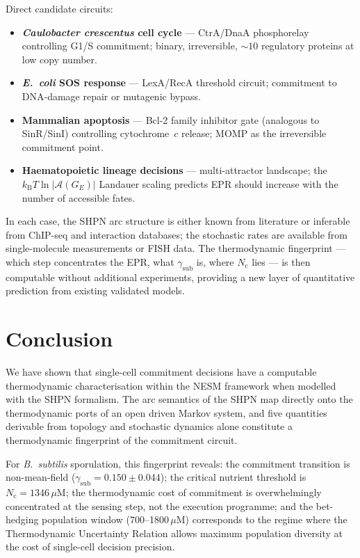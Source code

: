 \documentclass[11pt,a4paper]{article}
\newcommand{\kB}{k_{\mathrm{B}}}
\newcommand{\Ge}{G_E}
\newcommand{\gsub}{\gamma_{\mathrm{sub}}}
\newcommand{\Nc}{N_{\mathrm{c}}}
\begin{document}
Direct candidate circuits:\begin{itemize}
  \item \textbf{\textit{Caulobacter crescentus} cell cycle} ---
    CtrA/DnaA phosphorelay controlling G1/S commitment; binary, irreversible,
    $\sim 10$ regulatory proteins at low copy number.
  \item \textbf{\textit{E.~coli} SOS response} --- LexA/RecA threshold
    circuit; commitment to DNA-damage repair or mutagenic bypass.
  \item \textbf{Mammalian apoptosis} --- Bcl-2 family inhibitor gate
    (analogous to SinR/SinI) controlling cytochrome~$c$ release;
    MOMP as the irreversible commitment point.
  \item \textbf{Haematopoietic lineage decisions} --- multi-attractor
    landscape; the $\kB T \ln|\mathcal{A}(\Ge)|$ Landauer scaling
    predicts EPR should increase with the number of accessible fates.
\end{itemize}
In each case, the SHPN arc structure is either known from literature or
inferable from ChIP-seq and interaction databases; the stochastic rates
are available from single-molecule measurements or FISH data.
The thermodynamic fingerprint --- which step concentrates the EPR, what
$\gsub$ is, where $\Nc$ lies --- is then computable without additional
experiments, providing a new layer of quantitative prediction from
existing validated models.

\section{Conclusion}
\label{sec:conclusion}

We have shown that single-cell commitment decisions have a computable
thermodynamic characterisation within the NESM framework when modelled
with the SHPN formalism.
The arc semantics of the SHPN map directly onto the thermodynamic ports
of an open driven Markov system, and five quantities derivable from
topology and stochastic dynamics alone constitute a thermodynamic
fingerprint of the commitment circuit.

For \textit{B.~subtilis} sporulation, this fingerprint reveals:
the commitment transition is non-mean-field ($\gsub = 0.150 \pm 0.044$);
the critical nutrient threshold is $\Nc = 1346\,\mu$M;
the thermodynamic cost of commitment is overwhelmingly concentrated at
the sensing step, not the execution programme;
and the bet-hedging population window (700--1800\,$\mu$M) corresponds
to the regime where the Thermodynamic Uncertainty Relation allows
maximum population diversity at the cost of single-cell decision precision.
\end{document}
